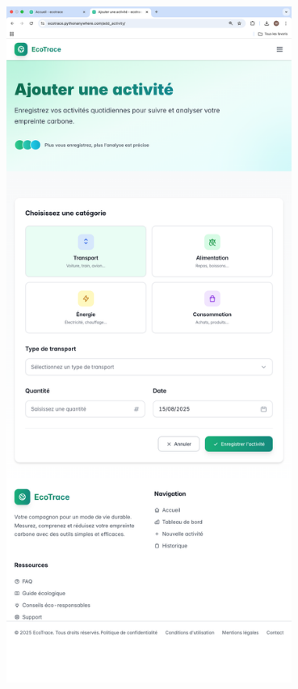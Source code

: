 \documentclass[a4paper,11pt]{article}
\begin{document}
\begin{enumerate}
\begin{center}
                        \end{center}
                        \begin{center}
                            \includegraphics[width=0.7\textwidth]{captures/servir/prod/img4.png}
                        \end{center}
                        \begin{center}

\end{center}
\end{enumerate}
\end{document}
